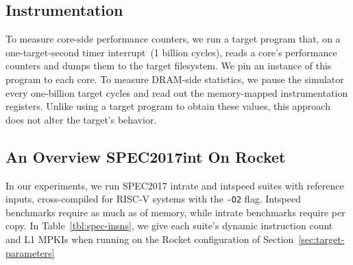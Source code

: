 \vspace{-0.05in}
\subsection{Instrumentation}
To measure core-side performance counters, we run a target program that, on a
one-target-second timer interrupt~(1 billion cycles), reads a core's
performance counters and dumps them to the target filesystem. We pin an
instance of this program to each core. To measure DRAM-side statistics,
we pause the simulator every one-billion target cycles and read out the
memory-mapped instrumentation registers. Unlike using a target program to
obtain these values, this approach does not alter the target's behavior.

\vspace{-0.05in}
\subsection{An Overview SPEC2017int On Rocket}
In our experiments, we run SPEC2017 intrate and intspeed suites with reference
inputs, cross-compiled for RISC-V systems with the \texttt{-O2} flag.
Intspeed benchmarks require as much as  of memory, while intrate
benchmarks require  per copy.  In Table~\ref{tbl:spec-insns}, we give each suite's dynamic instruction
count and L1 MPKIs when running on the Rocket configuration of
Section~\ref{sec:target-parameters}

